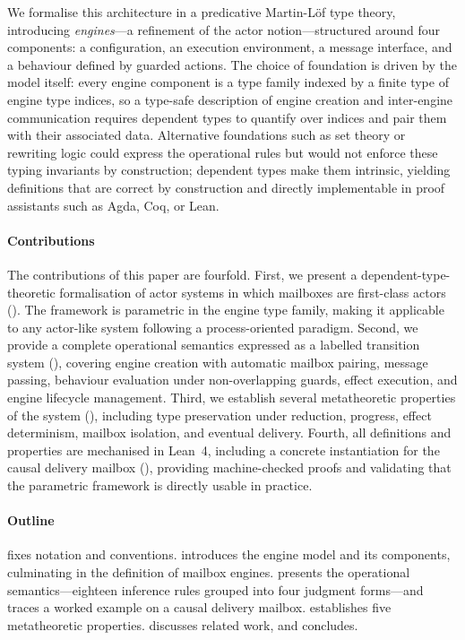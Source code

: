 \documentclass[
  a4paper,        %
  techreport,     %
]{art}
\begin{document}
We formalise this architecture in a predicative Martin-L\"of type theory,
introducing \emph{engines}---a refinement of the actor notion---structured
around four components: a configuration, an execution environment, a message
interface, and a behaviour defined by guarded actions. The choice of foundation
is driven by the model itself: every engine component is a type family indexed
by a finite type of engine type indices, so a type-safe description of engine
creation and inter-engine communication requires dependent types to quantify
over indices and pair them with their associated data. Alternative foundations
such as set theory or rewriting logic could express the operational rules but
would not enforce these typing invariants by construction; dependent types make
them intrinsic, yielding definitions that are correct by construction and
directly implementable in proof assistants such as Agda, Coq, or Lean.

\paragraph{Contributions}
The contributions of this paper are fourfold.
First, we present a dependent-type-theoretic formalisation of actor systems in
which mailboxes are first-class actors (). The framework is
parametric in the engine type family, making it applicable to any actor-like
system following a process-oriented paradigm.
Second, we provide a complete operational semantics expressed as a labelled
transition system (), covering engine creation with
automatic mailbox pairing, message passing, behaviour evaluation under
non-overlapping guards, effect execution, and engine lifecycle management.
Third, we establish several metatheoretic properties of the system
(), including type preservation under reduction, progress,
effect determinism, mailbox isolation, and eventual delivery.
Fourth, all definitions and properties are mechanised in Lean~4, including a
concrete instantiation for the causal delivery mailbox
(), providing machine-checked proofs and validating
that the parametric framework is directly usable in practice.

\paragraph{Outline}
 fixes notation and conventions.
 introduces the engine model and its components, culminating in
the definition of mailbox engines.  presents the
operational semantics---eighteen inference rules grouped into four judgment
forms---and traces a worked example on a causal delivery mailbox.
 establishes five metatheoretic properties.
 discusses related work, and 
concludes.
\end{document}
